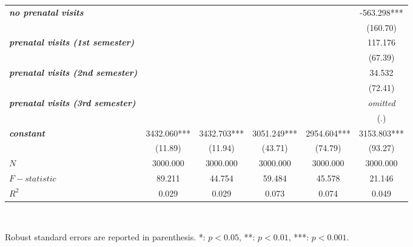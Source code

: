 \documentclass{article}
\begin{document}
\begin{table}[hp!]
\begin{adjustbox}{width=1\textwidth}
\begin{tabular}{l|ccccc|}
\multicolumn{1}{|l|}{\textit{\textbf{no prenatal visits}}}             &             &             &             &             & -563.298***      \\
\multicolumn{1}{|l|}{\textit{\textbf{}}}                               &             &             &             &             & (160.70)         \\
\multicolumn{1}{|l|}{\textit{\textbf{prenatal visits (1st semester)}}} &             &             &             &             & 117.176          \\
\multicolumn{1}{|l|}{\textit{\textbf{}}}                               &             &             &             &             & (67.39)          \\
\multicolumn{1}{|l|}{\textit{\textbf{prenatal visits (2nd semester)}}} &             &             &             &             & 34.532           \\
\multicolumn{1}{|l|}{\textit{\textbf{}}}                               &             &             &             &             & (72.41)          \\
\multicolumn{1}{|l|}{\textit{\textbf{prenatal visits (3rd semester)}}} &             &             &             &             & \textit{omitted} \\
\multicolumn{1}{|l|}{\textit{\textbf{}}}                               &             &             &             &             & (.)              \\
\multicolumn{1}{|l|}{\textit{\textbf{constant}}}                       & 3432.060*** & 3432.703*** & 3051.249*** & 2954.604*** & 3153.803***      \\
\multicolumn{1}{|l|}{\textit{\textbf{}}}                               & (11.89)     & (11.94)     & (43.71)     & (74.79)     & (93.27)          \\ \hline
\multicolumn{1}{|l|}{\textit{\textbf{$N$}}}                              & 3000.000    & 3000.000    & 3000.000    & 3000.000    & 3000.000         \\
\multicolumn{1}{|l|}{\textit{\textbf{$F-statistic$}}}                    & 89.211      & 44.754      & 59.484      & 45.578      & 21.146           \\
\multicolumn{1}{|l|}{\textit{\textbf{$R^2$}}}           & 0.029       & 0.029       & 0.073       & 0.074       & 0.049            \\ \hline
\end{tabular}
\end{adjustbox}
\\[1em]
\begin{minipage}{\textwidth} %
\footnotesize{Robust standard errors are reported in parenthesis. *: $p<0.05$, **: $p<0.01$, ***: $p<0.001$.\par}
\end{minipage}
\end{table}
\end{document}
